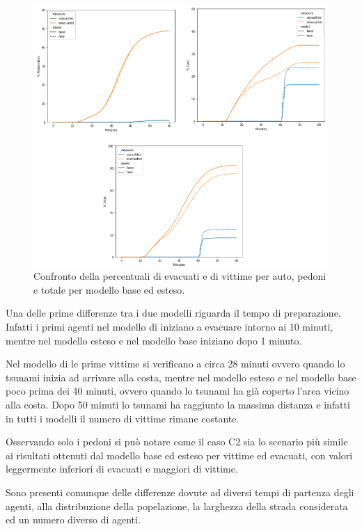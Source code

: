 \begin{figure}[ht]
    \centering
    \includegraphics[width=\textwidth]{images/analisi/WANG_comparison2.png}
    \caption{Confronto della percentuali di evacuati e di vittime per auto, pedoni e totale per modello base ed esteso.}
    \label{fig:analisi-comparison-wang2}
\end{figure}

Una delle prime differenze tra i due modelli riguarda il tempo di preparazione. Infatti i primi agenti nel modello di
\textcite{wang2021novel} iniziano a evacuare intorno ai 10 minuti, mentre nel modello esteso e nel modello base iniziano 
dopo 1 minuto.

Nel modello di \textcite{wang2021novel} le prime vittime si verificano a circa 28 minuti ovvero quando lo tsunami inizia ad arrivare alla costa, 
mentre nel modello esteso e nel modello base poco prima dei 40 minuti, ovvero quando lo tsunami ha già coperto l'area vicino alla costa. 
Dopo 50 minuti lo tsunami ha raggiunto la massima distanza e infatti in tutti i modelli il numero di vittime rimane costante.

Osservando solo i pedoni si può notare come il caso C2 sia lo scenario più simile ai risultati 
ottenuti dal modello base ed esteso per vittime ed evacuati, con valori leggermente inferiori di evacuati e maggiori di vittime.

Sono presenti comunque delle differenze dovute ad diversi tempi di partenza degli agenti, alla distribuzione della popelazione, la larghezza della strada considerata ed un numero diverso di agenti.

